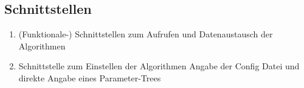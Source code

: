 \subsection{Schnittstellen}
\begin{enumerate}[ align=left, label={\textbf{\textbackslash S1\arabic*0\textbackslash}}]
\item (Funktionale-) Schnittstellen zum Aufrufen und Datenaustausch der Algorithmen
\item  Schnittstelle zum Einstellen der Algorithmen
Angabe der Config Datei und direkte Angabe eines Parameter-Trees
\end{enumerate}
